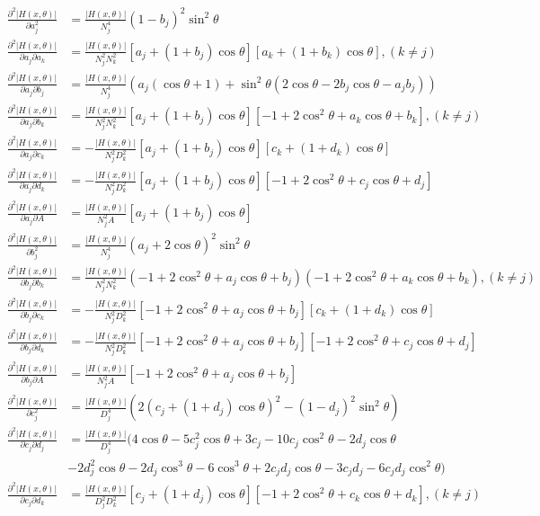\documentclass{ctexart}
\begin{document}
$$\begin{aligned}
	\frac{\partial^2{|H(x,\theta)|}}{\partial{a_j^2}}&=\frac{|H(x,\theta)|}{N_j^4}(1-b_j)^2\sin^2\theta\\
	\frac{\partial^2{|H(x,\theta)|}}{\partial{a_j}\partial{a_k}}&=\frac{|H(x,\theta)|}{N_j^2N_k^2}[a_j+(1+b_j)\cos\theta][a_k+(1+b_k)\cos\theta],(k\neq j)\\
	\frac{\partial^2{|H(x,\theta)|}}{\partial{a_j}\partial{b_j}}&=\frac{|H(x,\theta)|}{N_j^4}(a_j(\cos\theta+1)+\sin^2\theta(2\cos\theta-2b_j\cos\theta-a_jb_j))\\
	\frac{\partial^2{|H(x,\theta)|}}{\partial{a_j}\partial{b_k}}&=\frac{|H(x,\theta)|}{N_j^2N_k^2}[a_j+(1+b_j)\cos\theta][-1+2\cos^2\theta+a_k\cos\theta+b_k],(k\neq j)\\
	\frac{\partial^2{|H(x,\theta)|}}{\partial{a_j}\partial{c_k}}&=-\frac{|H(x,\theta)|}{N_j^2D_k^2}[a_j+(1+b_j)\cos\theta][c_k+(1+d_k)\cos\theta]\\
	\frac{\partial^2{|H(x,\theta)|}}{\partial{a_j}\partial{d_k}}&=-\frac{|H(x,\theta)|}{N_j^2D_k^2}[a_j+(1+b_j)\cos\theta][-1+2\cos^2\theta+c_j\cos\theta+d_j]\\
	\frac{\partial^2{|H(x,\theta)|}}{\partial{a_j}\partial{A}}&=\frac{|H(x,\theta)|}{N_j^2A}[a_j+(1+b_j)\cos\theta]\\
	\frac{\partial^2{|H(x,\theta)|}}{\partial{b_j^2}}&=\frac{|H(x,\theta)|}{N_j^4}(a_j+2\cos\theta)^2\sin^2\theta\\
	\frac{\partial^2{|H(x,\theta)|}}{\partial{b_j}\partial{b_k}}&=\frac{|H(x,\theta)|}{N_j^2N_k^2}(-1+2\cos^2\theta+a_j\cos\theta+b_j)(-1+2\cos^2\theta+a_k\cos\theta+b_k),(k\neq j)\\
	\frac{\partial^2{|H(x,\theta)|}}{\partial{b_j}\partial{c_k}}&=-\frac{|H(x,\theta)|}{N_j^2D_k^2}[-1+2\cos^2\theta+a_j\cos\theta+b_j][c_k+(1+d_k)\cos\theta]\\
	\frac{\partial^2{|H(x,\theta)|}}{\partial{b_j}\partial{d_k}}&=-\frac{|H(x,\theta)|}{N_j^2D_k^2}[-1+2\cos^2\theta+a_j\cos\theta+b_j][-1+2\cos^2\theta+c_j\cos\theta+d_j]\\
	\frac{\partial^2{|H(x,\theta)|}}{\partial{b_j}\partial{A}}&=\frac{|H(x,\theta)|}{N_j^2A}[-1+2\cos^2\theta+a_j\cos\theta+b_j]\\	
	\frac{\partial^2{|H(x,\theta)|}}{\partial{c_j^2}}&=\frac{|H(x,\theta)|}{D_j^4}(2(c_j+(1+d_j)\cos\theta)^2-(1-d_j)^2\sin^2\theta)\\
	\frac{\partial^2{|H(x,\theta)|}}{\partial{c_j}\partial{d_j}}&=\frac{|H(x,\theta)|}{D_j^4}(4\cos\theta-5c_j^2\cos\theta+3c_j-10c_j\cos^2\theta-2d_j\cos\theta\\
	&-2d_j^2\cos\theta-2d_j\cos^3\theta-6\cos^3\theta+2c_jd_j\cos\theta-3c_jd_j-6c_jd_j\cos^2\theta)\\
	\frac{\partial^2{|H(x,\theta)|}}{\partial{c_j}\partial{d_k}}&=\frac{|H(x,\theta)|}{D_j^2D_k^2}[c_j+(1+d_j)\cos\theta][-1+2\cos^2\theta+c_k\cos\theta+d_k],(k\neq j)\\
\end{aligned}$$
\end{document}
